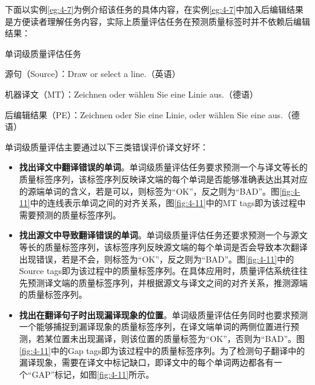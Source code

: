 \parinterval 下面以实例\ref{eg:4-7}为例介绍该任务的具体内容，在实例\ref{eg:4-7}中加入后编辑结果是方便读者理解任务内容，实际上质量评估任务在预测质量标签时并不依赖后编辑结果：

\begin{example}
单词级质量评估任务

源句（Source）：Draw or select a line.（英语）

机器译文（MT）：Zeichnen oder wählen Sie eine Linie aus.（德语）

后编辑结果（PE）：Zeichnen oder Sie eine Linie, oder wählen Sie eine aus.（德语）

\label{eg:4-7}
\end{example}

\parinterval 单词级质量评估主要通过以下三类错误评价译文好坏：

\begin{itemize}
\vspace{0.5em}
\item {\small\sffamily\bfseries{找出译文中翻译错误的单词}}。单词级质量评估任务要求预测一个与译文等长的质量标签序列，该标签序列反映译文端的每个单词是否能够准确表达出其对应的源端单词的含义，若是可以，则标签为“OK”，反之则为“BAD”。图\ref{fig:4-11}中的连线表示单词之间的对齐关系，图\ref{fig:4-11}中的MT tags即为该过程中需要预测的质量标签序列。
\vspace{0.5em}
\item {\small\sffamily\bfseries{找出源文中导致翻译错误的单词}}。单词级质量评估任务还要求预测一个与源文等长的质量标签序列，该标签序列反映源文端的每个单词是否会导致本次翻译出现错误，若是不会，则标签为“OK”，反之则为“BAD”。图\ref{fig:4-11}中的Source tags即为该过程中的质量标签序列。在具体应用时，质量评估系统往往先预测译文端的质量标签序列，并根据源文与译文之间的对齐关系，推测源端的质量标签序列。
\vspace{0.5em}
\item {\small\sffamily\bfseries{找出在翻译句子时出现漏译现象的位置}}。单词级质量评估任务同时也要求预测一个能够捕捉到漏译现象的质量标签序列，在译文端单词的两侧位置进行预测，若某位置未出现漏译，则该位置的质量标签为“OK”，否则为“BAD”。图\ref{fig:4-11}中的Gap tags即为该过程中的质量标签序列。为了检测句子翻译中的漏译现象，需要在译文中标记缺口，即译文中的每个单词两边都各有一个“GAP”标记，如图\ref{fig:4-11}所示。
\vspace{0.5em}
\end{itemize}


